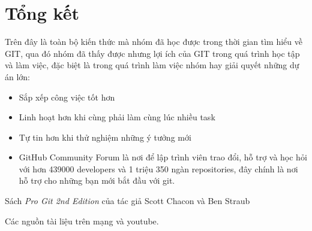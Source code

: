 \documentclass[12pt,a4paper]{report}
\begin{document}
\newpage

\chapter{Tổng kết} %

Trên đây  là toàn bộ kiến thức mà nhóm đã học được trong thời gian tìm hiểu về GIT, qua đó nhóm đã thấy được nhưng lợi ích của GIT trong quá trình học tập và làm việc, đặc biệt là trong quá trình làm việc nhóm hay giải quyết những dự án lớn:
\begin{itemize}
\item Sắp xếp công việc tốt hơn
\item Linh hoạt hơn khi cùng phải làm cùng lúc nhiều task
\item Tự tin hơn khi thử nghiệm những ý tưởng mới
\item GitHub Community Forum là nơi để lập trình viên trao đổi, hỗ trợ và học hỏi với hơn 439000 developers và 1 triệu 350 ngàn repositories, đây chính là nơi hỗ trợ cho những bạn mới bắt đầu với git.
\end{itemize}

\begin{thebibliography}{99} %


 Sách {\it Pro Git 2nd Edition} của tác giả Scott Chacon và Ben Straub

 Các nguồn tài liệu trên mạng và youtube.


\end{thebibliography}
\end{document}
